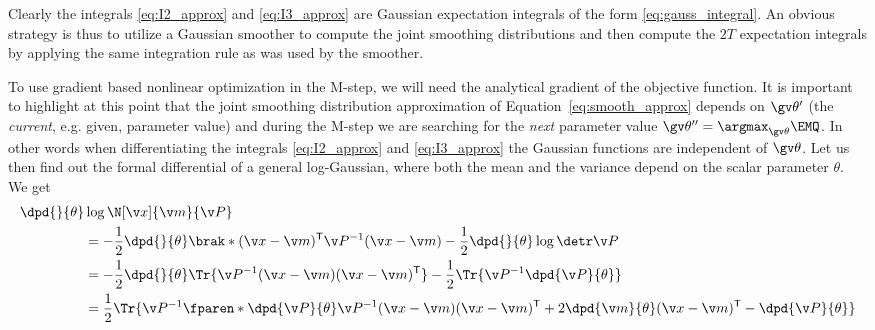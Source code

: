 Clearly the integrals \eqref{eq:I2_approx} and \eqref{eq:I3_approx} are Gaussian
expectation integrals of the form \eqref{eq:gauss_integral}. An obvious
strategy is thus to utilize a Gaussian smoother to compute the joint
smoothing distributions and then compute the $2T$ expectation integrals
by applying the same integration rule as was used by the smoother. 

To use gradient based nonlinear optimization in the M-step, we will need the analytical gradient of the objective
function. It is important to highlight at this point that the joint smoothing distribution approximation
of Equation~\eqref{eq:smooth_approx} depends on $\Th'$ (the \emph{current}, e.g. given, parameter value)
and during the M-step we are searching for the \emph{next} parameter value $\Th^{\prime\prime}=\argmax_{\Th}\EMQ$. In
other words when differentiating the integrals \eqref{eq:I2_approx} and \eqref{eq:I3_approx} the Gaussian functions
are independent of $\Th$.
Let us then find out the formal differential of a general log-Gaussian, where
both the mean and the variance depend on the scalar parameter $\theta$. We get
\begin{align*}
\begin{split}
	\dpd{}{\theta}&\log\N[\x]{\m}{\P}\\
	&=-\frac{1}{2}\dpd{}{\theta}\brak*{(\x-\m)^\tr\P^{-1}(\x-\m)}-\frac{1}{2}\dpd{}{\theta}\log\detr\P\\		
	&=-\frac{1}{2}\dpd{}{\theta}\Tr{\P^{-1}(\x-\m)(\x-\m)^\tr}-\frac{1}{2}\Tr{\P^{-1}\dpd{\P}{\theta}}\\		
	&=\frac{1}{2}\Tr{\P^{-1}\fparen*{\dpd{\P}{\theta}\P^{-1}(\x-\m)(\x-\m)^\tr+2\dpd{\m}{\theta}(\x-\m)^\tr-\dpd{\P}{\theta}}}		
\end{split}
\end{align*}


